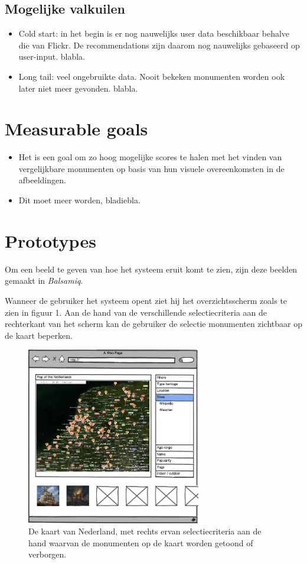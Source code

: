 \documentclass{article}
\begin{document}
\subsection{Mogelijke valkuilen}
\begin{itemize}
\item Cold start: in het begin is er nog nauwelijks user data beschikbaar behalve die van Flickr. De recommendations zijn daarom nog nauwelijks gebaseerd op user-input. blabla.
\item Long tail: veel ongebruikte data. Nooit bekeken monumenten worden ook later niet meer gevonden. blabla.
\end{itemize}
\section{Measurable goals}
\begin{itemize}
\item Het is een goal om zo hoog mogelijke scores te halen met het vinden van vergelijkbare monumenten op basis van hun visuele overeenkomsten in de afbeeldingen.
\item Dit moet meer worden, bladiebla.
\end{itemize}
\section{Prototypes}
Om een beeld te geven van hoe het systeem eruit komt te zien, zijn deze beelden gemaakt in \emph{Balsamiq}. 

Wanneer de gebruiker het systeem opent ziet hij het overzichtsscherm zoals te zien in figuur 1. Aan de hand van de verschillende selectiecriteria aan de rechterkant van het scherm kan de gebruiker de selectie monumenten zichtbaar op de kaart beperken.
\begin{figure}[htp]
  \centering
  \includegraphics[width=3in]{user-story-overview.png}
  \caption[Het overzichtsscherm]%
  {De kaart van Nederland, met rechts ervan selectiecriteria aan de hand waarvan de monumenten op de kaart worden getoond of verborgen.}
\end{figure}
\end{document}

